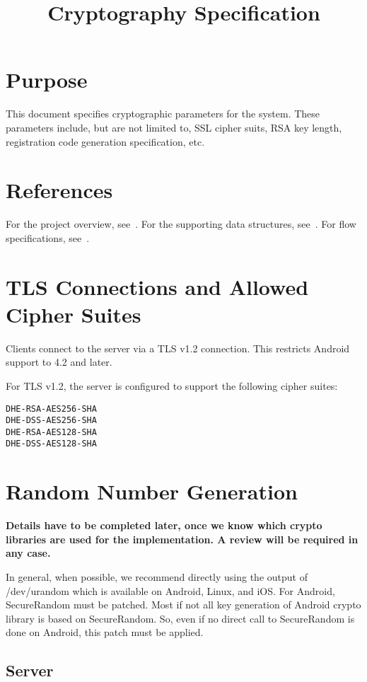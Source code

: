 \documentclass[a4paper,10pt]{article}
\title{\longProduct{} Cryptography Specification}
\begin{document}
\maketitle
\tableofcontents

\section{Purpose}
This document specifies cryptographic parameters for the \longProduct{} system. These parameters include, but are not limited to, SSL cipher suits, RSA key length, registration 
code generation specification, etc.

\section{References}
For the project overview, see~\cite{project_spec}. For the supporting data structures, see~\cite{data_structure_spec}. For flow specifications, see~\cite{flow_spec}.

\section{TLS Connections and Allowed Cipher Suites}
Clients connect to the server via a TLS v1.2 connection. This restricts Android support to 4.2 and later.

For TLS v1.2, the server is configured to support the following cipher suites:

\begin{verbatim}
DHE-RSA-AES256-SHA
DHE-DSS-AES256-SHA
DHE-RSA-AES128-SHA
DHE-DSS-AES128-SHA
\end{verbatim}

\section{Random Number Generation}
\textbf{Details have to be completed later, once we know which crypto libraries are used for the implementation. A review will be required in any case.}

In general, when possible, we recommend directly using the output of \\/dev/urandom which is available on Android, Linux, and iOS. For Android, SecureRandom must be patched. Most 
if not all key generation of Android crypto library is based on SecureRandom. So, even if no direct call to SecureRandom is done on Android, this patch must be applied.

\subsection{Server}
\end{document}
